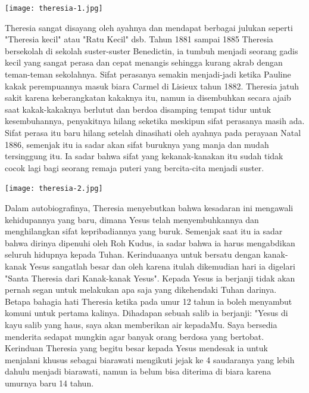 \begin{floatingfigure}[l]{2.75cm}
\begin{center}
\texttt{[image: theresia-1.jpg]}
\end{center}
\end{floatingfigure}
Theresia sangat disayang oleh ayahnya dan mendapat berbagai julukan seperti "Theresia kecil" atau "Ratu Kecil" dsb. Tahun 1881 sampai 1885 Theresia bersekolah di sekolah suster-suster Benedictin, ia tumbuh menjadi seorang gadis kecil yang sangat perasa dan cepat menangis sehingga kurang akrab dengan teman-teman sekolahnya. Sifat perasanya semakin menjadi-jadi ketika Pauline kakak perempuannya masuk biara Carmel di Lisieux tahun 1882. Theresia jatuh sakit karena keberangkatan kakaknya itu, namun ia disembuhkan secara ajaib saat kakak-kakaknya berlutut dan berdoa disamping tempat tidur untuk kesembuhannya, penyakitnya hilang seketika meskipun sifat perasanya masih ada. Sifat perasa itu baru hilang setelah dinasihati oleh ayahnya pada perayaan Natal 1886, semenjak itu ia sadar akan sifat buruknya yang manja dan mudah tersinggung itu. Ia sadar bahwa sifat yang kekanak-kanakan itu sudah tidak cocok lagi bagi seorang remaja puteri yang bercita-cita menjadi suster.

\begin{floatingfigure}[r]{3.75cm}
\begin{center}
\texttt{[image: theresia-2.jpg]}
\end{center}
\end{floatingfigure}
Dalam autobiografinya, Theresia menyebutkan bahwa kesadaran ini mengawali kehidupannya yang baru, dimana Yesus telah menyembuhkannya dan menghilangkan sifat kepribadiannya yang buruk. Semenjak saat itu ia sadar bahwa dirinya dipenuhi oleh Roh Kudus, ia sadar bahwa ia harus mengabdikan seluruh hidupnya kepada Tuhan. Kerinduaanya untuk bersatu dengan kanak-kanak Yesus sangatlah besar dan oleh karena itulah dikemudian hari ia digelari "Santa Theresia dari Kanak-kanak Yesus". Kepada Yesus ia berjanji tidak akan pernah segan untuk melakukan apa saja yang dikehendaki Tuhan darinya. Betapa bahagia hati Theresia ketika pada umur 12 tahun ia boleh menyambut komuni untuk pertama kalinya. Dihadapan sebuah salib ia berjanji: "Yesus di kayu salib yang haus, saya akan memberikan air kepadaMu. Saya bersedia menderita sedapat mungkin agar banyak orang berdosa yang bertobat. Kerinduan Theresia yang begitu besar kepada Yesus mendesak ia untuk menjalani khusus sebagai biarawati mengikuti jejak ke 4 saudaranya yang lebih dahulu menjadi biarawati, namun ia belum bisa diterima di biara karena umurnya baru 14 tahun.

